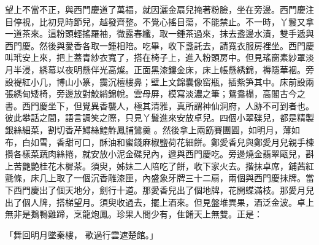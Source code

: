 望上不當不正，與西門慶道了萬福，就因灑金扇兒掩著粉臉，坐在旁邊。西門慶注目停視，比初見時節兒，越發齊整。不覺心搖目蕩，不能禁止。不一時，丫鬟又拿一道茶來。這粉頭輕搖羅袖，微露春纖，取一鍾茶過來，抹去盞邊水漬，雙手遞與西門慶。然後與愛香各取一鍾相陪。吃畢，收下盞託去，請寬衣服房裡坐。西門慶叫玳安上來，把上蓋青紗衣寬了，搭在椅子上，進入粉頭房中。但見瑤窗素紗罩淡月半浸，綉幕以夜明懸伴光高燦。正面黑漆鏤金床，床上帳懸綉錦，褥隱華裀。旁設褆紅小几，博山小篆，靄沉檀樓鼻；壁上文錦囊像窑瓶，插紫笋其中。床前設兩張綉甸矮椅，旁邊放對鮫綃錦帨。雲母屏，模寫淡濃之筆；鴛鴦榻，高閣古今之書。西門慶坐下，但覺異香襲人，極其清雅，真所謂神仙洞府，人跡不可到者也。彼此攀話之間，語言調笑之際，只見丫鬟進來安放卓兒。四個小翠碟兒，都是精製銀絲細菜，割切香芹鱘絲鰉鮓鳳脯鷥羹 。然後拿上兩筯賽團圓，如明月，薄如布，白如雪，香甜可口，酥油和蜜錢麻椒鹽荷花細餅。鄭愛香兒與鄭愛月兒親手楝攢各樣菜蔬肉絲捲，就安放小泥金碟兒內，遞與西門慶吃。旁邊燒金翡翠甌兒，斟上苦艷艷桂花木樨茶。須臾，姊妹二人陪吃了餅，收下家火去。揩抹卓席，鋪茜紅氈條，床几上取了一個沉香雕漆匣，內盛象牙牌三十二扇，兩個與西門慶抹牌。當下西門慶出了個天地分，劍行十道。那愛香兒出了個地牌，花開蝶滿枝。那愛月兒出了個人牌，搭梯望月。須臾收過去，擺上酒來。但見盤堆異果，酒泛金波。卓上無非是鵝鴨雞蹄，烹龍炮鳳。珍果人間少有，隹餚天上無雙。正是：

「舞回明月墜秦樓，  歌過行雲遮楚館。」


